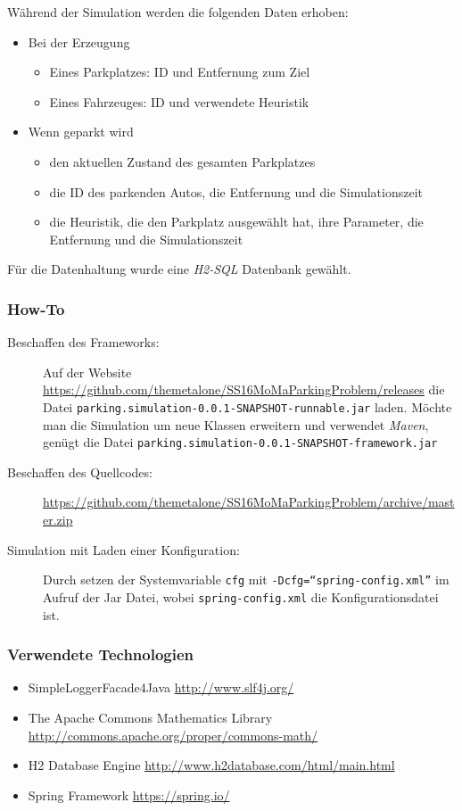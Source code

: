 Während der Simulation werden die folgenden Daten erhoben:
\begin{itemize}
	\item Bei der Erzeugung
	\begin{itemize}
		\item Eines Parkplatzes: ID und Entfernung zum Ziel
		\item Eines Fahrzeuges: ID und verwendete Heuristik
	\end{itemize}
	\item Wenn geparkt wird
	\begin{itemize}
		\item den aktuellen Zustand des gesamten Parkplatzes
		\item die ID des parkenden Autos, die Entfernung und die Simulationszeit
		\item die Heuristik, die den Parkplatz ausgewählt hat, ihre Parameter, die Entfernung und die Simulationszeit
	\end{itemize}
\end{itemize}
Für die Datenhaltung wurde eine \emph{H2-SQL} Datenbank gewählt. 

\subsubsection*{How-To}
\begin{description}
	\item[Beschaffen des Frameworks:] Auf der Website \url{https://github.com/themetalone/SS16MoMaParkingProblem/releases} die Datei \texttt{parking.simulation-0.0.1-SNAPSHOT-runnable.jar} laden. Möchte man die Simulation um neue Klassen erweitern und verwendet \emph{Maven}, genügt die Datei \texttt{parking.simulation-0.0.1-SNAPSHOT-framework.jar}
	\item[Beschaffen des Quellcodes:] \url{https://github.com/themetalone/SS16MoMaParkingProblem/archive/master.zip}
	\item[Simulation mit Laden einer Konfiguration:] Durch setzen der Systemvariable \texttt{cfg} mit \texttt{-Dcfg=``spring-config.xml''} im Aufruf der Jar Datei, wobei \texttt{spring-config.xml} die Konfigurationsdatei ist.
\end{description}

\subsubsection*{Verwendete Technologien}
\begin{itemize}
	\item SimpleLoggerFacade4Java \url{http://www.slf4j.org/}
	\item The Apache Commons Mathematics Library \url{http://commons.apache.org/proper/commons-math/}
	\item H2 Database Engine \url{http://www.h2database.com/html/main.html}
	\item Spring Framework \url{https://spring.io/}
\end{itemize}
